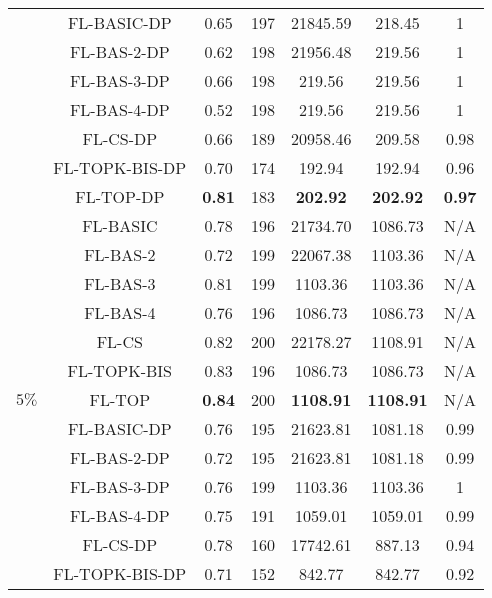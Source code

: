 \documentclass[accepted]{uai2021} %
\begin{document}
\begin{table*}[!ht]
{\begin{tabular}{|c|c|c|c|c|c|c|}
        \cline{2-7}
        \cline{2-7}
        &  FL-BASIC-DP   &  0.65  & 197 & 21845.59 & 218.45 & 1\\
        \cline{2-7}
        &  FL-BAS-2-DP  & 0.62  & 198  & 21956.48 & 219.56 & 1\\
        \cline{2-7}
        &  FL-BAS-3-DP  &  0.66  & 198 & 219.56 & 219.56 & 1\\
        \cline{2-7}
        &  FL-BAS-4-DP  &  0.52  & 198 & 219.56 & 219.56 & 1\\
        \cline{2-7}
        &  FL-CS-DP  &  0.66  & 189 & 20958.46 & 209.58 & 0.98 \\
        \cline{2-7}
        &  FL-TOPK-BIS-DP  &  0.70  & 174 & 192.94 & 192.94 & 0.96\\
        \cline{2-7}
        &  FL-TOP-DP   & \textbf{0.81} & 183 & \textbf{202.92}  & \textbf{202.92} & \textbf{0.97}\\
        \hline
        \hline
        \multirow{14}{*}{$5\%$} &  FL-BASIC   &  0.78 & 196 & 21734.70 & 1086.73 & N/A  \\
        \cline{2-7}
        &  FL-BAS-2  &  0.72  & 199 & 22067.38 & 1103.36 & N/A  \\
        \cline{2-7}
        &  FL-BAS-3  &  0.81  & 199 & 1103.36 & 1103.36 &N/A  \\
        \cline{2-7}
        &  FL-BAS-4  &  0.76  & 196 & 1086.73 & 1086.73 & N/A  \\
        \cline{2-7}
        &  FL-CS  &  0.82  & 200 & 22178.27 & 1108.91 & N/A  \\
        \cline{2-7}
        &  FL-TOPK-BIS  &  0.83  & 196 & 1086.73 & 1086.73 & N/A  \\
        \cline{2-7}
        &  FL-TOP   & \textbf{0.84}  & 200 & \textbf{1108.91} & \textbf{1108.91} & N/A \\
        \cline{2-7}
        \cline{2-7}
        &  FL-BASIC-DP   &  0.76  & 195 & 21623.81 & 1081.18 & 0.99 \\
        \cline{2-7}
        &  FL-BAS-2-DP  &  0.72  & 195 & 21623.81 & 1081.18 & 0.99 \\
        \cline{2-7}
        &  FL-BAS-3-DP  &  0.76  & 199 & 1103.36 & 1103.36 & 1 \\
        \cline{2-7}
        &  FL-BAS-4-DP  &  0.75 & 191 & 1059.01 & 1059.01 & 0.99\\
        \cline{2-7}
        &  FL-CS-DP  &  0.78  & 160 & 17742.61 & 887.13 & 0.94 \\
        \cline{2-7}
        &  FL-TOPK-BIS-DP  &  0.71  & 152 & 842.77 & 842.77 & 0.92\\

\end{tabular}}
\end{table*}
\end{document}
